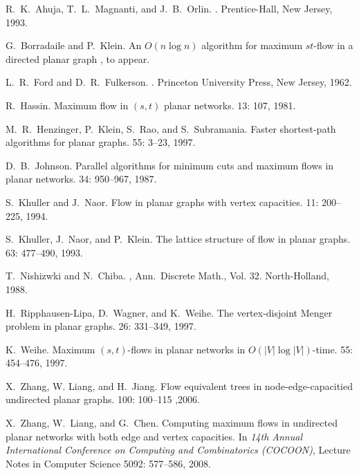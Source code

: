 \documentclass[a4paper,11pt]{article}
\begin{document}
\begin{thebibliography}{10}
R.~K.~Ahuja, T.~L.~Magnanti, and J.~B.~Orlin.
.
\newblock Prentice-Hall, New Jersey, 1993.

G.~Borradaile and P.~Klein.
\newblock An $O(n \log n)$ algorithm for maximum $st$-flow in a directed planar graph
, to appear.

L.~R.~Ford and D.~R.~Fulkerson.
.
\newblock Princeton University Press, New Jersey, 1962.

R.~Hassin.
\newblock Maximum flow in $(s, t)$ planar networks.
 13: 107, 1981.

M.~R.~Henzinger, P.~Klein, S.~Rao, and S.~Subramania.
\newblock Faster shortest-path algorithms for planar graphs.
 55: 3--23, 1997.

D.~B.~Johnson.
\newblock Parallel algorithms for minimum cuts and maximum flows in planar networks.
 34: 950--967, 1987.

S.~Khuller and J.~Naor.
\newblock Flow in planar graphs with vertex capacities.
 11: 200--225, 1994.

S.~Khuller, J.~Naor, and P.~Klein.
\newblock The lattice structure of flow in planar graphs.
 63: 477--490, 1993.

T.~Nishizwki and N.~Chiba.
, Ann.\ Discrete Math., Vol. 32.
\newblock North-Holland, 1988.

H.~Ripphausen-Lipa, D.~Wagner, and K.~Weihe.
\newblock The vertex-disjoint Menger problem in planar graphs.
 26: 331--349, 1997.

K.~Weihe.
\newblock Maximum $(s, t)$-flows in planar networks in $O(|V|\log|V|)$-time.
 55: 454--476, 1997.

X.~Zhang, W. Liang, and H.~Jiang.
\newblock Flow equivalent trees in node-edge-capacitied undirected planar graphs.
 100: 100--115 ,2006.

X.~Zhang, W.~Liang, and G.~Chen.
\newblock Computing maximum flows in undirected planar networks with both edge and vertex capacities.
\newblock In {\em 14th Annual International Conference on Computing and Combinatorics (COCOON)},
Lecture Notes in Computer Science 5092: 577--586, 2008.

\end{thebibliography}
\end{document}
